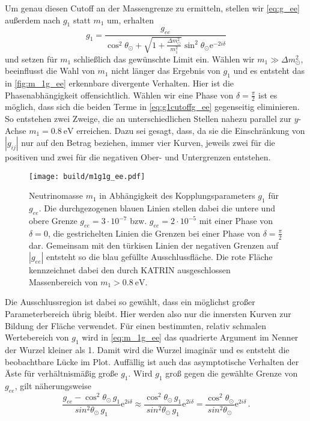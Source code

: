 Um genau diesen Cutoff an der Massengrenze zu ermitteln, stellen wir \eqref{eq:g_ee} außerdem nach $g_1$ statt $m_1$ um, erhalten
\begin{equation}
    g_1 = \frac{g_{ee}}{\cos^2\theta_\odot + \sqrt{1 + \frac{\Delta m^2_\odot}{m^2_1}} \sin^2\theta_\odot \mathrm{e}^{-2 i \delta}} 
    \label{eq:g1cutoffg_ee}
\end{equation}
und setzen für $m_1$ schließlich das gewünschte Limit ein.
Wählen wir $m_1 \gg \Delta m^2_\odot$, beeinflusst die Wahl von $m_1$ nicht länger das Ergebnis von $g_1$ und es entsteht das in \autoref{fig:m_1g_ee} erkennbare divergente Verhalten.
Hier ist die Phasenabhängigkeit offensichtlich.
Wählen wir eine Phase von $\delta = \frac{\pi}{2}$ ist es möglich, dass sich die beiden Terme in \eqref{eq:g1cutoffg_ee} gegenseitig eliminieren.
So entstehen zwei Zweige, die an unterschiedlichen Stellen nahezu parallel zur $y$-Achse $m_1 = \SI{0.8}{\eV}$ erreichen.
Dazu sei gesagt, dass, da sie die Einschränkung von $|g_{i j}|$ nur auf den Betrag beziehen, immer vier Kurven, jeweils zwei für die positiven und zwei für die negativen Ober- und Untergrenzen entstehen.
\begin{figure}[H]
    \centering
    \texttt{[image: build/m1g1g\_ee.pdf]}
    \caption{Neutrinomasse $m_1$ in Abhängigkeit des Kopplungsparameters $g_1$ für $g_{ee}$. Die durchgezogenen blauen Linien stellen dabei die untere und obere Grenze $g_{ee} = 3 \cdot 10^{-7}$ bzw. $g_{ee} = 2 \cdot 10^{-5}$
            mit einer Phase von $\delta = 0$, die gestrichelten Linien die Grenzen bei einer Phase von $\delta = \frac{\pi}{2}$ dar. Gemeinsam mit den türkisen Linien der negativen Grenzen auf $|g_{ee}|$ entsteht so die blau
            gefüllte Ausschlussfläche. Die rote Fläche kennzeichnet dabei den durch KATRIN ausgeschlossen Massenbereich von $m_1 > \SI{0.8}{\eV}$.}
    \label{fig:m_1g_ee}
\end{figure}
Die Ausschlussregion ist dabei so gewählt, dass ein möglichst großer Parameterbereich übrig bleibt.
Hier werden also nur die innersten Kurven zur Bildung der Fläche verwendet.
Für einen bestimmten, relativ schmalen Wertebereich von $g_1$ wird in \eqref{eq:m_1g_ee} das quadrierte Argument im Nenner der Wurzel kleiner als 1.
Damit wird die Wurzel imaginär und es entsteht die beobachtbare Lücke im Plot.
Auffällig ist auch das asymptotische Verhalten der Äste für verhältnismäßig große $g_1$.
Wird $g_1$ groß gegen die gewählte Grenze von $g_{ee}$, gilt näherungsweise 
\begin{equation*}
    \frac{g_{ee} -  \cos^2 \theta_\odot \, g_1}{sin^2 \theta_\odot \, g_1} \mathrm{e}^{2 i \delta} \approx \frac{\cos^2 \theta_\odot \, g_1}{sin^2 \theta_\odot \, g_1} \mathrm{e}^{2 i \delta}
    = \frac{\cos^2 \theta_\odot}{sin^2 \theta_\odot} \mathrm{e}^{2 i \delta} \,.
\end{equation*}

